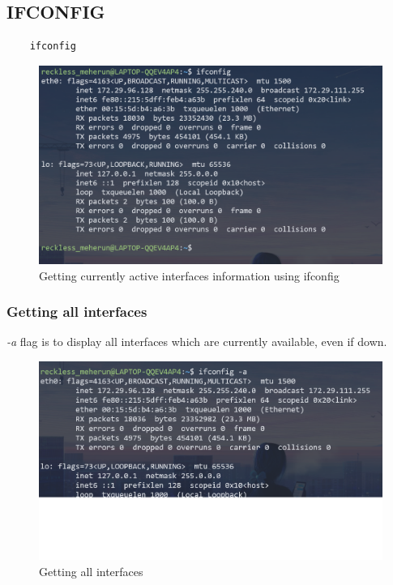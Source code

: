 \documentclass[11pt]{article}
\begin{document}
\subsection{IFCONFIG}
\begin{verbatim}
	ifconfig
\end{verbatim}
\begin{figure}[H]
\centering
\includegraphics[width=\textwidth]{res/ifconfig 1.png}
\caption{Getting currently active interfaces information using ifconfig}
\end{figure}

\subsubsection*{Getting all interfaces}
\emph{-a} flag is to display all interfaces which are currently available, even if down.
\begin{figure}[H]
\centering
\includegraphics[width=\textwidth]{res/ifconfig 2.png}
\caption{Getting all interfaces}
\end{figure}
\end{document}
